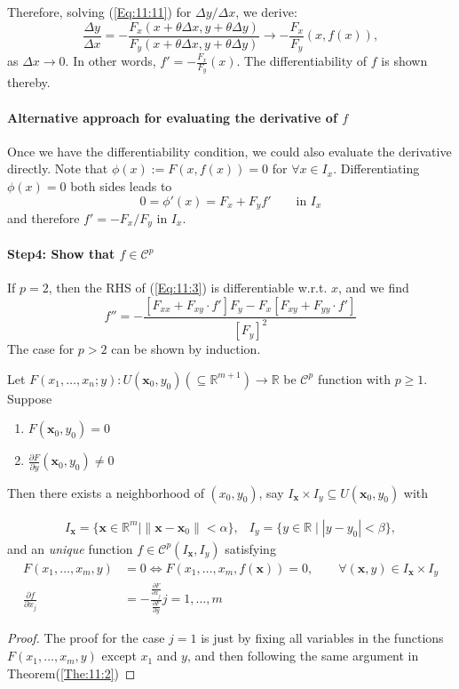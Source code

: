 Therefore, solving (\ref{Eq:11:11}) for $\Delta y/\Delta x$, we derive:
\begin{equation}
\frac{\Delta y}{\Delta x}=-\frac{F_x(x+\theta\Delta x,y+\theta\Delta y)}{F_y(x+\theta\Delta x,y+\theta\Delta y)}
\to-\frac{F_x}{F_y}(x,f(x)),
\end{equation}
as $\Delta x\to0$. In other words, $f'=-\frac{F_x}{F_y}(x)$. The differentiability of $f$ is shown thereby.
\paragraph{Alternative approach for evaluating the derivative of $f$}
Once we have the differentiability condition, we could also evaluate the derivative directly.
Note that $\phi(x):=F(x,f(x))=0$ for $\forall x\in I_x$. Differentiating $\phi(x)=0$ both sides leads to
\[
0=\phi'(x)=F_x+F_yf'\qquad\mbox{in }I_x
\]
and therefore $f'=-F_x/F_y$ in $I_x$.
\paragraph{Step4: Show that $f\in\mathcal{C}^p$}
If $p=2$, then the RHS of (\ref{Eq:11:3}) is differentiable w.r.t. $x$, and we find
\[
f''=-\frac{[F_{xx} + F_{xy}\cdot f']F_y - F_x[F_{xy} + F_{yy}\cdot f']}{[F_y]^2}
\]
The case for $p>2$ can be shown by induction.



\begin{theorem}
Let $F(x_1,\dots,x_n;y): U(\bm x_0,y_0) (\subseteq\mathbb{R}^{m+1})\to\mathbb{R}$ be $\mathcal{C}^p$ function with $p\ge1$. Suppose
\begin{enumerate}
\item
$F(\bm x_0,y_0)=0$
\item
$\frac{\partial F}{\partial y}(\bm x_0,y_0)\ne0$
\end{enumerate}

Then there exists a neighborhood of $(x_0,y_0)$, say $I_{\bm x}\times I_y\subseteq U(\bm x_0,y_0)$ with


\[
\begin{array}{ll}
I_{\bm x}=\{\bm x\in\mathbb{R}^m\mid \|\bm x-\bm x_0\|<\alpha\},
&
I_{y}=\{y\in\mathbb{R}\mid |y-y_0|<\beta\},
\end{array}
\]
and an \emph{unique} function $f\in\mathcal{C}^p(I_{\bm x},I_y)$ satisfying
\begin{align}
F(x_1,\dots,x_m,y)&=0\Longleftrightarrow
F(x_1,\dots,x_m,f(\bm x))=0,\qquad
\forall (\bm x,y)\in I_{\bm x}\times I_y\\
\frac{\partial f}{\partial x_j}&=-\frac{\frac{\partial F}{\partial x_j}}{\frac{\partial F}{\partial y}} j=1,\dots,m
\end{align}

\end{theorem}
\begin{proof}
The proof for the case $j=1$ is just by fixing all variables in the functions $F(x_1,\dots,x_m,y)$ except $x_1$ and $y$, and then following the same argument in Theorem(\ref{The:11:2})
\end{proof}







